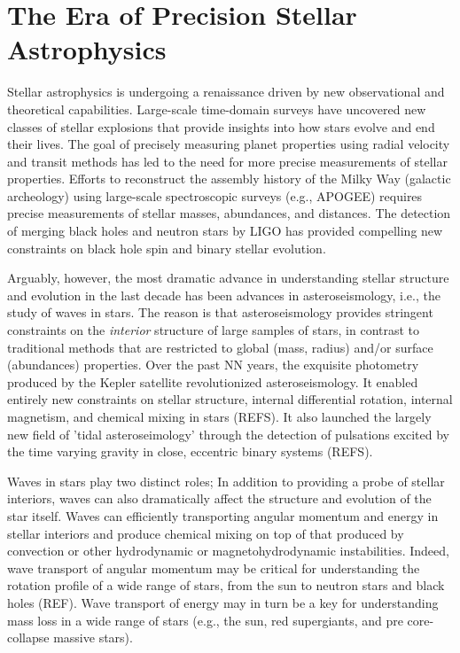 \section{The Era of Precision Stellar Astrophysics}

Stellar astrophysics is undergoing a renaissance driven by new observational and theoretical capabilities. Large-scale time-domain surveys have uncovered new classes of stellar explosions that provide insights into how stars evolve and end their lives.  The goal of precisely measuring planet properties using radial velocity and transit methods has led to the need for more precise measurements of stellar properties.  Efforts to reconstruct the assembly history of the Milky Way (galactic archeology) using large-scale spectroscopic surveys (e.g., APOGEE) requires precise measurements of stellar masses, abundances, and distances.   The detection of merging black holes and neutron stars by LIGO has provided compelling new constraints on black hole spin and binary stellar evolution. 

Arguably, however, the most dramatic advance in understanding stellar structure and evolution in the last decade has been advances in asteroseismology, i.e., the study of waves in stars.   The reason is that asteroseismology provides stringent constraints on the {\em interior} structure of large samples of stars, in contrast to traditional methods that are restricted to global (mass, radius) and/or surface (abundances) properties.   Over the past NN years, the exquisite photometry produced by the Kepler satellite revolutionized asteroseismology.  It enabled entirely new constraints on stellar structure, internal differential rotation, internal magnetism, and chemical mixing in stars (REFS).  It also launched the largely new field of 'tidal asteroseimology' through the detection of pulsations excited by the time varying gravity in close, eccentric binary systems (REFS). 

Waves in stars play two distinct roles;  In addition to providing a probe of stellar interiors, waves  can also dramatically affect the structure and evolution of the star itself.   Waves can efficiently transporting angular momentum and energy in stellar interiors and produce chemical mixing on top of that produced by convection or other hydrodynamic or magnetohydrodynamic instabilities.   Indeed, wave transport of angular momentum may be critical for understanding the rotation profile of a wide range of stars, from the sun to neutron stars and black holes (REF).   Wave transport of energy may in turn be a key for understanding mass loss in a wide range of stars (e.g., the sun, red supergiants, and pre core-collapse massive stars).   

